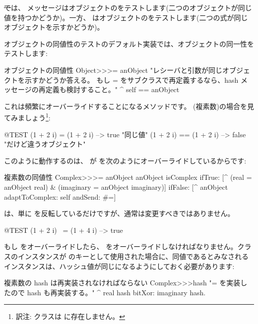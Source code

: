 \documentclass[a4paper,10pt,twoside]{book}
\begin{document}
\st では、\ct{=} メッセージはオブジェクトのをテストします(\ie 二つのオブジェクトが同じ値を持つかどうか)。一方、\ct{==} はオブジェクトのをテストします(\ie 二つの式が同じオブジェクトを示すかどうか)。

オブジェクトの同値性のテストのデフォルト実装では、オブジェクトの同一性をテストします:
\begin{method}{オブジェクトの同値性}
Object>>>= anObject
    "レシーバと引数が同じオブジェクトを示すかどうか答える。
    もし = をサブクラスで再定義するなら、hash メッセージの再定義も検討すること。"
    ^ self == anObject
\end{method}

これは頻繁にオーバーライドすることになるメソッドです。 (複素数)の場合を見てみましょう\footnote{訳注:  クラスは  に存在しません。}:

\begin{code}{@TEST}
(1 + 2 i) = (1 + 2 i)   --> true     "同じ値"
(1 + 2 i) == (1 + 2 i) --> false    "だけど違うオブジェクト"
\end{code}

このように動作するのは、 が \ct{=} を次のようにオーバーライドしているからです:
\begin{method}{複素数の同値性}
Complex>>>= anObject
    anObject isComplex
        ifTrue: [^ (real = anObject real) & (imaginary = anObject imaginary)]
        ifFalse: [^ anObject adaptToComplex: self andSend: #=]
\end{method}

 は、単に \ct{=} を反転しているだけですが、通常は変更すべきではありません。

\begin{code}{@TEST}
(1 + 2 i) ~= (1 + 4 i) --> true
\end{code}

もし \ct{=} をオーバーライドしたら、 をオーバーライドしなければなりません。クラスのインスタンスが  のキーとして使用された場合に、同値であるとみなされるインスタンスは、ハッシュ値が同じになるようにしておく必要があります:%
\begin{method}{複素数の hash は再実装されなければならない}
Complex>>>hash
    "= を実装したので hash も再実装する。"
    ^ real hash bitXor: imaginary hash.
\end{method}
\end{document}
